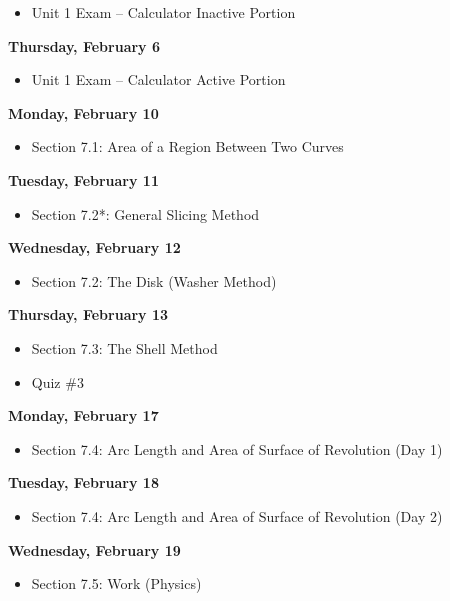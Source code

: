 \documentclass[11pt]{article}
\begin{document}
\begin{itemize}
\item Unit 1 Exam -- Calculator Inactive Portion
\end{itemize}

\textbf{Thursday, February 6}

\begin{itemize}
\item Unit 1 Exam -- Calculator Active Portion
\end{itemize}

\textbf{Monday, February 10}

\begin{itemize}
\item Section 7.1: Area of a Region Between Two Curves
\end{itemize}

\textbf{Tuesday, February 11}

\begin{itemize}
\item Section 7.2*: General Slicing Method
\end{itemize}

\textbf{Wednesday, February 12}

\begin{itemize}
\item Section 7.2: The Disk (Washer Method)
\end{itemize}

\textbf{Thursday, February 13}

\begin{itemize}
\item Section 7.3: The Shell Method
\item Quiz \#3
\end{itemize}

\textbf{Monday, February 17}

\begin{itemize}
\item Section 7.4: Arc Length and Area of Surface of Revolution (Day 1)
\end{itemize}

\textbf{Tuesday, February 18}

\begin{itemize}
\item Section 7.4: Arc Length and Area of Surface of Revolution (Day 2)
\end{itemize}

\textbf{Wednesday, February 19}

\begin{itemize}
\item Section 7.5:  Work (Physics)
\end{itemize}
\end{document}
